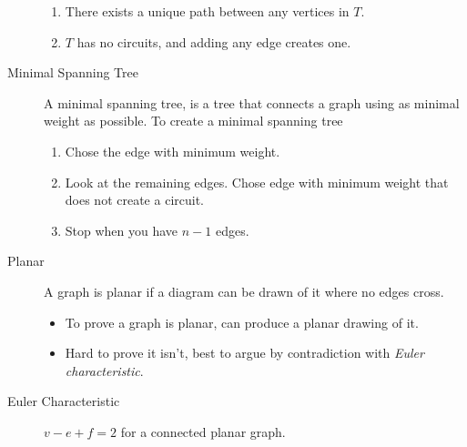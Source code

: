 \documentclass[../main.tex]{subfiles}
\begin{document}
\begin{description}
\begin{enumerate}[(1)]
      \item There exists a unique path between any vertices in $T$.
      \item $T$ has no circuits, and adding any edge creates one.
    \end{enumerate}
  \item[Minimal Spanning Tree] A minimal spanning tree, is a tree that connects
    a graph using as minimal weight as possible. To create a minimal spanning
    tree
    \begin{enumerate}
      \item Chose the edge with minimum weight.
      \item Look at the remaining edges. Chose edge with minimum weight that does
        not create a circuit.
      \item Stop when you have $n-1$ edges.
    \end{enumerate}
  \item[Planar] A graph is planar if a diagram can be drawn of it where no
    edges cross.
    \begin{itemize}
      \item To prove a graph is planar, can produce a planar drawing of it.
      \item Hard to prove it isn't, best to argue by contradiction with
        \textit{Euler characteristic}.
    \end{itemize}

  \item[Euler Characteristic] $v-e+f=2$ for a connected planar graph.
\end{description}
\end{document}
